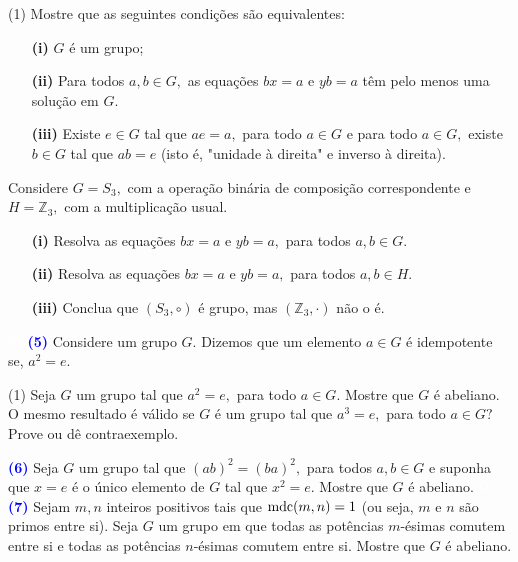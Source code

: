 \documentclass[12pt, a4paper]{article}
\newcommand{\mdc}{{\rm mdc}}
\newcommand{\negrito}[1]{\mbox{\boldmath{$#1$}}}
\begin{document}
\begin{tasks}[counter-format={(tsk[a])},label-width=3.6ex, label-format = {\bfseries}, column-sep = {0pt}](1)
\task[\textcolor{Floresta}{$\negrito{(a)} $}] Mostre que as seguintes condições são equivalentes:
\begin{itemize}
\item[\textbf{(i)}] $G$ é um grupo;
\item[\textbf{(ii)}] Para todos $a,b \in G,$ as equações $bx = a$ e $yb = a$  têm pelo menos uma solução em $G.$
\item[\textbf{(iii)}] Existe $e \in G$ tal que $ae = a,$ para todo $a \in G$ e para todo $a \in G,$ existe $b \in G$ tal que $ab = e$ (isto é, "unidade à direita" e inverso à direita).
\end{itemize}
\task[\textcolor{Floresta}{$\negrito{(b)} $}] Considere $G = S_3,$ com a operação binária de composição correspondente e $H = \mathbb{Z}_3,$ com a multiplicação usual. 
\begin{itemize}
\item[\textbf{(i)}] Resolva as equações $bx = a$ e $yb = a,$ para todos $a,b \in G.$
\item[\textbf{(ii)}] Resolva as equações $bx = a$ e $yb = a,$ para todos $a,b \in H.$
\item[\textbf{(iii)}] Conclua que $(S_3, \circ)$ é grupo, mas $(\mathbb{Z}_3, \cdot)$ não o é.
\end{itemize}
\end{tasks} 
\textcolor{white}{Oi}\newline\newline
\textcolor{blue}{\bf(5)}\label{5} Considere um grupo $G$. Dizemos que um elemento $a \in G$ é idempotente se, $a^2 = e.$
\begin{tasks}[counter-format={(tsk[a])},label-width=3.6ex, label-format = {\bfseries}, column-sep = {0pt}](1)
\task[\textcolor{Floresta}{$\negrito{(a)} $}] Seja $G$ um grupo tal que $a^2 = e,$ para todo $a \in G.$ Mostre que $G$ é abeliano.
\task[\textcolor{Floresta}{$\negrito{(b)} $}] O mesmo resultado é válido se $G$ é um grupo tal que $a^3 = e,$ para todo $a \in G?$ Prove ou dê contraexemplo.
\end{tasks}
\textcolor{blue}{\bf(6)}\label{6} Seja $G$ um grupo tal que $(ab)^2 = (ba)^2,$ para todos $a,b \in G$ e suponha que $x = e$ é o único elemento de $G$ tal que $x^2 = e.$ Mostre que $G$ é abeliano. 
\textcolor{white}{Oi}\newline\newline
\textcolor{blue}{\bf(7)}\label{7} Sejam $m,n$ inteiros positivos tais que $\mdc(m,n) = 1$ (ou seja, $m$ e $n$ são primos entre si). Seja $G$ um grupo em que todas as potências $m$-ésimas comutem entre si e todas as potências $n$-ésimas comutem entre si. Mostre que $G$ é abeliano.
\end{document}
